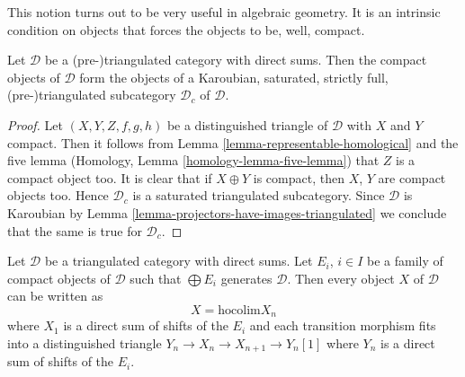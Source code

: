 \noindent
This notion turns out to be very useful in algebraic geometry.
It is an intrinsic condition on objects that forces the objects
to be, well, compact.

\begin{lemma}
\label{lemma-compact-objects-subcategory}
Let $\mathcal{D}$ be a (pre-)triangulated category with direct sums.
Then the compact objects of $\mathcal{D}$ form the objects of a
Karoubian, saturated, strictly full, (pre-)triangulated subcategory
$\mathcal{D}_c$ of $\mathcal{D}$.
\end{lemma}

\begin{proof}
Let $(X, Y, Z, f, g, h)$ be a distinguished triangle of $\mathcal{D}$
with $X$ and $Y$ compact. Then it follows from
Lemma \ref{lemma-representable-homological}
and the five lemma
(Homology, Lemma \ref{homology-lemma-five-lemma})
that $Z$ is a compact object too. It is clear that if $X \oplus Y$
is compact, then $X$, $Y$ are compact objects too. Hence
$\mathcal{D}_c$ is a saturated triangulated subcategory.
Since $\mathcal{D}$ is Karoubian by
Lemma \ref{lemma-projectors-have-images-triangulated}
we conclude that the same is true for $\mathcal{D}_c$.
\end{proof}

\begin{lemma}
\label{lemma-write-as-colimit}
Let $\mathcal{D}$ be a triangulated category with direct sums.
Let $E_i$, $i \in I$ be a family of compact objects of $\mathcal{D}$
such that $\bigoplus E_i$ generates $\mathcal{D}$.
Then every object $X$ of $\mathcal{D}$ can be written as
$$
X = \text{hocolim} X_n
$$
where $X_1$ is a direct sum of shifts of the $E_i$ and each transition
morphism fits into a distinguished triangle
$Y_n \to X_n \to X_{n + 1} \to Y_n[1]$
where $Y_n$ is a direct sum of shifts of the $E_i$.
\end{lemma}

